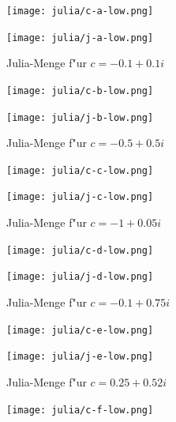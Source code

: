 \begin{refsection}
\begin{figure}
\begin{center}
\texttt{[image: julia/c-a-low.png]}

\bigskip

\texttt{[image: julia/j-a-low.png]}
\end{center}
\caption{Julia-Menge f"ur $c= -0.1+0.1i$\label{julia:a}}
\end{figure}

\begin{figure}
\begin{center}
\texttt{[image: julia/c-b-low.png]}

\bigskip

\texttt{[image: julia/j-b-low.png]}
\end{center}
\caption{Julia-Menge f"ur $c= -0.5+0.5i$\label{julia:b}}
\end{figure}

\begin{figure}
\begin{center}
\texttt{[image: julia/c-c-low.png]}

\bigskip

\texttt{[image: julia/j-c-low.png]}
\end{center}
\caption{Julia-Menge f"ur $c= -1+0.05i$\label{julia:c}}
\end{figure}

\begin{figure}
\begin{center}
\texttt{[image: julia/c-d-low.png]}

\bigskip

\texttt{[image: julia/j-d-low.png]}
\end{center}
\caption{Julia-Menge f"ur $c= -0.1+0.75i$\label{julia:d}}
\end{figure}

\begin{figure}
\begin{center}
\texttt{[image: julia/c-e-low.png]}

\bigskip

\texttt{[image: julia/j-e-low.png]}
\end{center}
\caption{Julia-Menge f"ur $c= 0.25+0.52i$\label{julia:e}}
\end{figure}

\begin{figure}
\begin{center}
\texttt{[image: julia/c-f-low.png]}

\bigskip


\end{center}
\end{figure}
\end{refsection}
